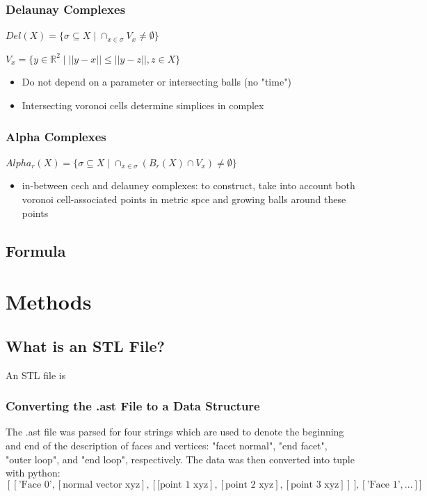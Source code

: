 \documentclass{article}
\begin{document}
\subsubsection{Delaunay Complexes}
$Del(X) = \{\sigma \subseteq X \mid \cap_{x \in \sigma} V_{x} \not= \emptyset\}$

$V_{x} = \{y \in \mathbb{R}^{2} \mid ||y-x|| \leq  ||y-z||, z \in X\}$
\begin{itemize}
\item Do not depend on a parameter or intersecting balls (no "time")
\item Intersecting voronoi cells determine simplices in complex
\end{itemize}

\subsubsection{Alpha Complexes}
$Alpha_{r}(X)=\{\sigma \subseteq X \mid \cap_{x\in \sigma} (B_{r}(X) \cap V_{x}) \not= \emptyset\}$
\begin{itemize}
\item in-between cech and delauney complexes: to construct, take into account both voronoi cell-associated points in metric spce and growing balls around these points

\end{itemize}
\subsection{Formula}

\section{Methods}

\subsection{What is an STL File?}
An STL file is 

\subsubsection{Converting the .ast File to a Data Structure}

The .ast file was parsed for four strings which are used to denote the beginning and end of the description of faces and vertices: "facet normal", "end facet", "outer loop", and "end loop", respectively. The data was then converted into tuple with python:
$$[[\text{'Face 0'}, [\text{normal vector xyz}],[\text{[point 1 xyz}], [\text{point 2 xyz}], [\text{point 3 xyz}]]], [\text{'Face 1'}, ... ]]$$
\end{document}
